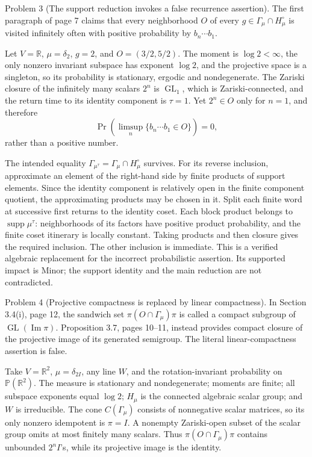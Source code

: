 \documentclass[10pt]{article}
\begin{document}
Problem 3 (The support reduction invokes a false recurrence assertion).  The first paragraph of page 7 claims that every neighborhood \(O\) of every \(g\in\Gamma_\mu\cap H_\mu^\circ\) is visited infinitely often with positive probability by \(b_n\cdots b_1\).\par
Let \(V=\mathbb R\), \(\mu=\delta_2\), \(g=2\), and \(O=(3/2,5/2)\). The moment is \(\log2<\infty\), the only nonzero invariant subspace has exponent \(\log2\), and the projective space is a singleton, so its probability is stationary, ergodic and nondegenerate. The Zariski closure of the infinitely many scalars \(2^n\) is \(\operatorname{GL}_1\), which is Zariski-connected, and the return time to its identity component is \(\tau=1\). Yet \(2^n\in O\) only for \(n=1\), and therefore \[\Pr\!\left(\limsup_n\{b_n\cdots b_1\in O\}\right)=0,\] rather than a positive number.\par
The intended equality \(\Gamma_{\mu^\tau}=\Gamma_\mu\cap H_\mu^\circ\) survives. For its reverse inclusion, approximate an element of the right-hand side by finite products of support elements. Since the identity component is relatively open in the finite component quotient, the approximating products may be chosen in it. Split each finite word at successive first returns to the identity coset. Each block product belongs to \(\operatorname{supp}\mu^\tau\): neighborhoods of its factors have positive product probability, and the finite coset itinerary is locally constant. Taking products and then closure gives the required inclusion. The other inclusion is immediate. This is a verified algebraic replacement for the incorrect probabilistic assertion. Its supported impact is Minor; the support identity and the main reduction are not contradicted.\par
Problem 4 (Projective compactness is replaced by linear compactness).  In Section 3.4(i), page 12, the sandwich set \(\pi(O\cap\Gamma_\mu)\pi\) is called a compact subgroup of \(\operatorname{GL}(\operatorname{Im}\pi)\). Proposition 3.7, pages 10–11, instead provides compact closure of the projective image of its generated semigroup. The literal linear-compactness assertion is false.\par
Take \(V=\mathbb R^2\), \(\mu=\delta_{2I}\), any line \(W\), and the rotation-invariant probability on \(\mathbb P(\mathbb R^2)\). The measure is stationary and nondegenerate; moments are finite; all subspace exponents equal \(\log2\); \(H_\mu\) is the connected algebraic scalar group; and \(W\) is irreducible. The cone \(C(\Gamma_\mu)\) consists of nonnegative scalar matrices, so its only nonzero idempotent is \(\pi=I\). A nonempty Zariski-open subset of the scalar group omits at most finitely many scalars. Thus \(\pi(O\cap\Gamma_\mu)\pi\) contains unbounded \(2^nI\)’s, while its projective image is the identity.\par
\end{document}
